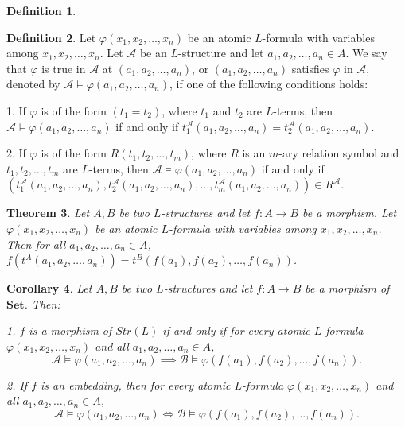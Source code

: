 \documentclass[12pt, reqno]{amsart}
\newtheorem{theorem}{Theorem}[section]
\newtheorem{corollary}[theorem]{Corollary}
\theoremstyle{definition}
\newtheorem{definition}[theorem]{Definition}
\theoremstyle{remark}
\numberwithin{equation}{section}
\begin{document}
{\begin{definition}
\end{definition}

\begin{definition}
    Let $\varphi(x_1, x_2, \ldots, x_n)$ be an atomic $L$-formula with variables among $x_1, x_2, \ldots, x_n$. Let $\mathcal{A}$ be an $L$-structure and let $a_1, a_2, \ldots, a_n\in A$. We say that $\varphi$ is true in $\mathcal{A}$ at $(a_1, a_2, \ldots, a_n)$, or $(a_1, a_2, \ldots, a_n)$ satisfies $\varphi$ in $\mathcal{A}$, denoted by $\mathcal{A}\models \varphi(a_1, a_2, \ldots, a_n)$, if one of the following conditions holds:

    1. If $\varphi$ is of the form $(t_1 = t_2)$, where $t_1$ and $t_2$ are $L$-terms, then $\mathcal{A}\models \varphi(a_1, a_2, \ldots, a_n)$ if and only if $t_1^{\mathcal{A}}(a_1, a_2, \ldots, a_n) = t_2^{\mathcal{A}}(a_1, a_2, \ldots, a_n)$.

    2. If $\varphi$ is of the form $R(t_1, t_2, \ldots, t_m)$, where $R$ is an $m$-ary relation symbol and $t_1, t_2, \ldots, t_m$ are $L$-terms, then $\mathcal{A}\models \varphi(a_1, a_2, \ldots, a_n)$ if and only if $(t_1^{\mathcal{A}}(a_1, a_2, \ldots, a_n), t_2^{\mathcal{A}}(a_1, a_2, \ldots, a_n), \ldots, t_m^{\mathcal{A}}(a_1, a_2, \ldots, a_n))\in R^{\mathcal{A}}$.
\end{definition}

\begin{theorem}
    Let $A, B$ be two $L$-structures and let $f: A\to B$ be a morphism. Let $\varphi(x_1, x_2, \ldots, x_n)$ be an atomic $L$-formula with variables among $x_1, x_2, \ldots, x_n$. Then for all $a_1, a_2, \ldots, a_n\in A$, $f(t^{A}(a_1, a_2, \ldots, a_n)) = t^{B}(f(a_1), f(a_2), \ldots, f(a_n))$.
\end{theorem}

\begin{corollary}
    Let $A, B$ be two $L$-structures and let $f: A\to B$ be a morphism of $\mathbf{Set}$. Then:

    1. $f$ is a morphism of $Str(L)$ if and only if for every atomic $L$-formula $\varphi(x_1, x_2, \ldots, x_n)$ and all $a_1, a_2, \ldots, a_n\in A$,
   \[
    \mathcal{A}\models \varphi(a_1, a_2, \ldots, a_n) \implies \mathcal{B}\models \varphi(f(a_1), f(a_2), \ldots, f(a_n)).
   \]

    2. If $f$ is an embedding, then for every atomic $L$-formula $\varphi(x_1, x_2, \ldots, x_n)$ and all $a_1, a_2, \ldots, a_n\in A$,
    \[
    \mathcal{A}\models \varphi(a_1, a_2, \ldots, a_n) \iff \mathcal{B}\models \varphi(f(a_1), f(a_2), \ldots, f(a_n)).
    \]
\end{corollary}

}
\end{document}
